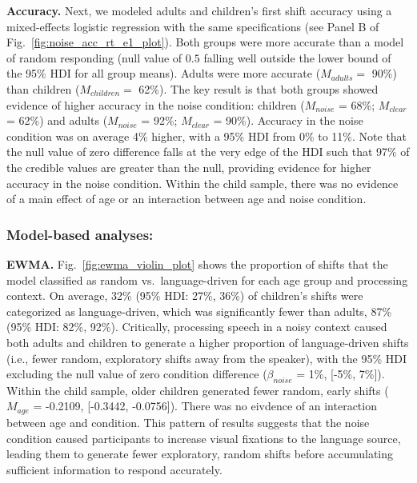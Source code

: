 \documentclass[10pt, letterpaper]{article}
\begin{document}
\textbf{Accuracy.} Next, we modeled adults and children's first shift
accuracy using a mixed-effects logistic regression with the same
specifications (see Panel B of Fig.~\ref{fig:noise_acc_rt_e1_plot}).
Both groups were more accurate than a model of random responding (null
value of \(0.5\) falling well outside the lower bound of the 95\% HDI
for all group means). Adults were more accurate (\(M_{adults} =\) 90\%)
than children (\(M_{children} =\) 62\%). The key result is that both
groups showed evidence of higher accuracy in the noise condition:
children (\(M_{noise}\) = 68\%; \(M_{clear}\) = 62\%) and adults
(\(M_{noise}\) = 92\%; \(M_{clear}\) = 90\%). Accuracy in the noise
condition was on average 4\% higher, with a 95\% HDI from 0\% to 11\%.
Note that the null value of zero difference falls at the very edge of
the HDI such that 97\% of the credible values are greater than the null,
providing evidence for higher accuracy in the noise condition. Within
the child sample, there was no evidence of a main effect of age or an
interaction between age and noise condition.

\subsubsection{Model-based analyses:}\label{model-based-analyses}

\textbf{EWMA.} Fig.~\ref{fig:ewma_violin_plot} shows the proportion of
shifts that the model classified as random vs.~language-driven for each
age group and processing context. On average, 32\% (95\% HDI: 27\%,
36\%) of children's shifts were categorized as language-driven, which
was significantly fewer than adults, 87\% (95\% HDI: 82\%, 92\%).
Critically, processing speech in a noisy context caused both adults and
children to generate a higher proportion of language-driven shifts
(i.e., fewer random, exploratory shifts away from the speaker), with the
95\% HDI excluding the null value of zero condition difference
(\(\beta_{noise}\) = 1\%, {[}-5\%, 7\%{]}). Within the child sample,
older children generated fewer random, early shifts (\(M_{age}\) =
-0.2109, {[}-0.3442, -0.0756{]}). There was no eivdence of an
interaction between age and condition. This pattern of results suggests
that the noise condition caused participants to increase visual
fixations to the language source, leading them to generate fewer
exploratory, random shifts before accumulating sufficient information to
respond accurately.
\end{document}
